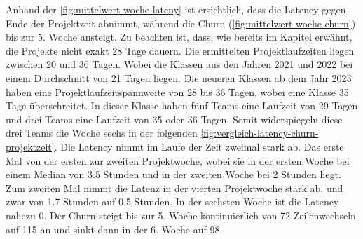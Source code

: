 Anhand der \autoref{fig:mittelwert-woche-lateny} ist ersichtlich, dass die Latency gegen Ende der Projektzeit abnimmt, während die Churn (\autoref{fig:mittelwert-woche-churn}) bis zur 5. Woche ansteigt. 
Zu beachten ist, dass, wie bereits im Kapitel  erwähnt, die Projekte nicht exakt 28 Tage dauern. Die ermittelten Projektlaufzeiten liegen zwischen 20 und 36 Tagen.
Wobei die Klassen aus den Jahren 2021 und 2022 bei einem Durchschnitt von 21 Tagen liegen. Die neueren Klassen ab dem Jahr 2023 haben eine Projektlaufzeitspannweite von 28 bis 36 Tagen, wobei eine Klasse 35 Tage überschreitet. In dieser Klasse haben fünf Teams eine Laufzeit von 29 Tagen und drei Teams eine Laufzeit von 35 oder 36 Tagen. Somit widerspiegeln diese drei Teams die Woche sechs in der folgenden \autoref{fig:vergleich-latency-churn-projektzeit}. Die Latency nimmt im Laufe der Zeit zweimal stark ab. Das erste Mal von der ersten zur zweiten Projektwoche, wobei sie in der ersten Woche bei einem Median von 3.5 Stunden und in der zweiten Woche bei 2 Stunden liegt. Zum zweiten Mal nimmt die Latenz in der vierten Projektwoche stark ab, und zwar von 1.7 Stunden auf 0.5 Stunden. In der sechsten Woche ist die Latency nahezu 0. Der Churn steigt bis zur 5. Woche kontinuierlich von 72 Zeilenwechseln auf 115 an und sinkt dann in der 6. Woche auf 98.
